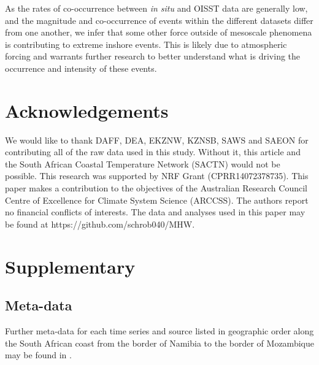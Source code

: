 \documentclass[a4paper,10pt,review]{elsarticle}
\begin{document}
As the rates of co-occurrence between \emph{in situ} and OISST data are generally low, and the magnitude and co-occurrence of events within the different datasets differ from one another, we infer that some other force outside of mesoscale phenomena is contributing to extreme inshore events. This is likely due to atmospheric forcing and warrants further research to better understand what is driving the occurrence and intensity of these events.

\section*{Acknowledgements}
We would like to thank DAFF, DEA, EKZNW, KZNSB, SAWS and SAEON for contributing all of the raw data used in this study. Without it, this article and the South African Coastal Temperature Network (SACTN) would not be possible. This research was supported by NRF Grant (CPRR14072378735). This paper makes a contribution to the objectives of the Australian Research Council Centre of Excellence for Climate System Science (ARCCSS). The authors report no financial conflicts of interests. The data and analyses used in this paper may be found at https://github.com/schrob040/MHW.

\newcommand{\beginsupplement}{%
        \setcounter{table}{0}
        \renewcommand{\thetable}{S\arabic{table}}%
        \setcounter{figure}{0}
        \renewcommand{\thefigure}{S\arabic{figure}}%
     }
\beginsupplement

\section*{Supplementary}
\subsection*{Meta-data}
Further meta-data for each time series and source listed in geographic order along the South African coast from the border of Namibia to the border of Mozambique may be found in .
\end{document}
